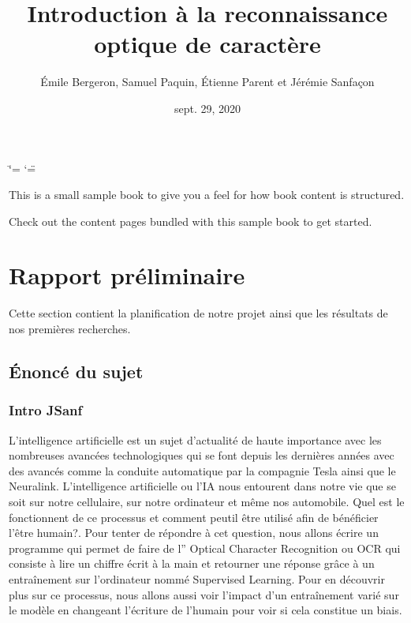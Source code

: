 \documentclass[letterpaper,10pt,french]{sphinxmanual}
\title{Introduction à la reconnaissance optique de caractère}
\date{sept. 29, 2020}
\author{Émile Bergeron, Samuel Paquin, Étienne Parent et Jérémie Sanfaçon}
\begin{document}
\ifdefined\shorthandoff
  \ifnum\catcode`\=\string=\active\shorthandoff{=}\fi
  \ifnum\catcode`\"=\active{}\fi
\fi

\pagestyle{empty}
\sphinxmaketitle
\pagestyle{plain}
\sphinxtableofcontents
\pagestyle{normal}
\label{\detokenize{intro::doc}}


This is a small sample book to give you a feel for how book content is
structured.

Check out the content pages bundled with this sample book to get started.


\chapter{Rapport préliminaire}
\label{\detokenize{rapport_preliminaire:rapport-preliminaire}}\label{\detokenize{rapport_preliminaire::doc}}
Cette section contient la planification de notre projet ainsi que les
résultats de nos premières recherches.


\section{Énoncé du sujet}
\label{\detokenize{enonce_sujet:enonce-du-sujet}}\label{\detokenize{enonce_sujet::doc}}

\subsection{Intro JSanf}
\label{\detokenize{enonce_sujet:intro-jsanf}}
L’intelligence artificielle est un sujet d’actualité de haute importance avec les
nombreuses avancées
technologiques qui se font depuis les dernières années avec des avancés comme la
conduite automatique
par la compagnie Tesla ainsi que le Neuralink. L’intelligence artificielle ou
l’IA nous entourent
dans notre vie que se soit sur notre cellulaire, sur notre ordinateur et même nos automobile.
Quel est le fonctionnent de ce processus et comment peut\sphinxhyphen{}il être utilisé afin de
bénéficier l’être humain?. Pour tenter de répondre à cet question, nous allons
écrire un programme qui permet de faire de l” Optical Character Recognition ou OCR
qui consiste à lire un chiffre écrit à la main et retourner une réponse grâce à
un entraînement sur l’ordinateur nommé Supervised Learning. Pour en découvrir
plus sur ce processus, nous allons aussi voir l’impact d’un entraînement varié
sur le modèle en changeant l’écriture de l’humain pour voir si cela constitue un
biais.
\end{document}
